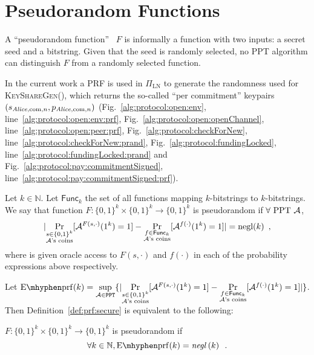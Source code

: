 \section{Pseudorandom Functions}
\label{sec:prf}
  A ``pseudorandom function''~\cite{katzlindell} $F$ is informally a function
  with two inputs: a secret seed and a bitstring. Given that the seed is
  randomly selected, no PPT algorithm can distinguish $F$ from a randomly
  selected function.

  In the current work a PRF is used in $\Pi_{\mathrm{LN}}$ to generate the
  randomness used for \textsc{KeyShareGen}(), which returns the so-called ``per
  commitment'' keypairs $(s_{\mathit{Alice}, \mathrm{com}, n}, p_{\mathit{Alice}, \mathrm{com},
  n})$ (Fig.~\ref{alg:protocol:open:env}, line~\ref{alg:protocol:open:env:prf},
  Fig.~\ref{alg:protocol:open:openChannel},
  line~\ref{alg:protocol:open:peer:prf}, Fig.~\ref{alg:protocol:checkForNew},
  line~\ref{alg:protocol:checkForNew:prand},
  Fig.~\ref{alg:protocol:fundingLocked},
  line~\ref{alg:protocol:fundingLocked:prand} and
  Fig.~\ref{alg:protocol:pay:commitmentSigned},
  line~\ref{alg:protocol:pay:commitmentSigned:prf}).

  \begin{definition}
    \label{def:prf:secure}
    Let $k \in \mathbb{N}$. Let $\mathsf{Func}_k$ the set of all functions
    mapping $k$-bitstrings to $k$-bitstrings. We say that function $F: \{0,
    1\}^k \times \{0, 1\}^k \rightarrow \{0, 1\}^k$ is pseudorandom if $\forall
    \text{ PPT } \mathcal{A}$,
    \begin{equation*}
      |\underset{\substack{s \in \{0, 1\}^k \\ \mathcal{A}\text{'s
      coins}}}{\Pr}[\mathcal{A}^{F(s, \cdot)}(1^k) = 1] - \underset{\substack{f
      \in \mathsf{Func}_k \\ \mathcal{A}\text{'s
      coins}}}{\Pr}[\mathcal{A}^{f(\cdot)}(1^k) = 1]| = \text{negl}(k) \enspace,
    \end{equation*}
    where \adversary{} is given oracle access to $F(s, \cdot)$ and $f(\cdot)$ in
    each of the probability expressions above respectively.
  \end{definition}

    Let $\mathrm{E \mhyphen prf}(k) = \underset{\adversary \in
    \mathtt{PPT}}{\sup}\{|\underset{\substack{s \in \{0, 1\}^k \\
    \adversary\text{'s coins}}}{\Pr}[\adversary^{F(s, \cdot)}(1^k) = 1] -
    \underset{\substack{f \in \mathsf{Func}_k \\ \adversary\text{'s
    coins}}}{\Pr}[\adversary^{f(\cdot)}(1^k) = 1]|\}$. Then
    Definition~\ref{def:prf:secure} is equivalent to the following:

    \begin{definition}
      \label{def:prf:secure:sup}
      $F: \{0, 1\}^k \times \{0, 1\}^k \rightarrow \{0, 1\}^k$ is pseudorandom
      if
      \begin{equation*}
        \forall k \in \mathbb{N}, \mathrm{E \mhyphen prf}(k) =
        \mathit{negl}\left(k\right) \enspace.
      \end{equation*}
    \end{definition}
